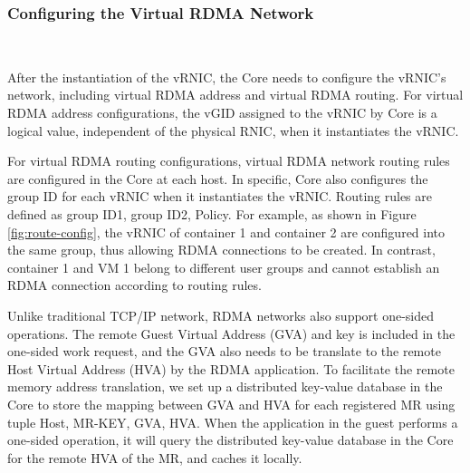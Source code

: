 \subsubsection{\textbf{Configuring the Virtual RDMA Network}}
\
\noindent

After the instantiation of the vRNIC, the \sys Core needs to configure the vRNIC's network, including virtual RDMA address and virtual RDMA routing.
For virtual RDMA address configurations, the vGID assigned to the vRNIC by \sys Core is a logical value, independent of the physical RNIC, when it instantiates the vRNIC.


For virtual RDMA routing configurations, virtual RDMA network routing rules are configured in the \sys Core at each host. In specific, \sys Core also configures the group ID for each vRNIC when it instantiates the vRNIC. Routing rules are defined as {group ID1, group ID2, Policy}. For example, as shown in Figure \ref{fig:route-config}, the vRNIC of container 1 and container 2 are configured into the same group, thus allowing RDMA connections to be created. In contrast, container 1 and VM 1 belong to different user groups and cannot establish an RDMA connection according to routing rules.


Unlike traditional TCP/IP network, RDMA networks also support one-sided operations. The remote Guest Virtual Address (GVA) and key is included in the one-sided work request, and the GVA also needs to be translate to the remote Host Virtual Address (HVA) by the RDMA application. To facilitate the remote memory address translation, we set up a distributed key-value database in the \sys Core to store the mapping between GVA and HVA for each registered MR using tuple {Host, MR-KEY, GVA, HVA}. When the application in the guest performs a one-sided operation, it will query the distributed key-value database in the \sys Core for the remote HVA of the MR, and caches it locally.

